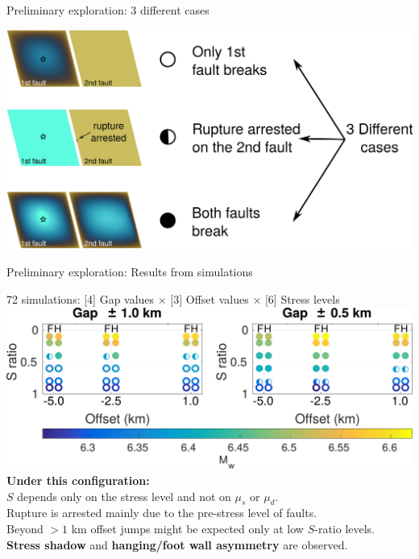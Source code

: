 \documentclass{beamer}
\begin{document}
\begin{frame}
 {Preliminary exploration: 3 different cases}

 \includegraphics[width=1\linewidth]{images/cases.png}
 \addtocounter{framenumber}{-1}
 
\end{frame}
 
\begin{frame}
 {Preliminary exploration: Results from simulations}
 
{\small 72 simulations: [4] Gap values $\times$ [3] Offset values $\times$ [6] Stress levels}
 \vskip 0.2cm
 \includegraphics[width=1\linewidth]{images/results_table}
\vskip -0.5cm{\bf Under this configuration:} \pause \\
\vskip 0.1cm
\small $S$ depends only on the stress level and not on $\mu_s$ or $\mu_d$. \pause \\ 
\vskip 0.1cm
\small Rupture is arrested mainly due to the pre-stress level of faults. \pause \\
\vskip 0.1cm
\small Beyond $>1$ km offset jumps might be expected only at low $S$-ratio levels. \pause \\
\vskip 0.1cm
\small {\bf Stress shadow} and {\bf hanging/foot wall asymmetry} are observed. 

\end{frame}
\end{document}
